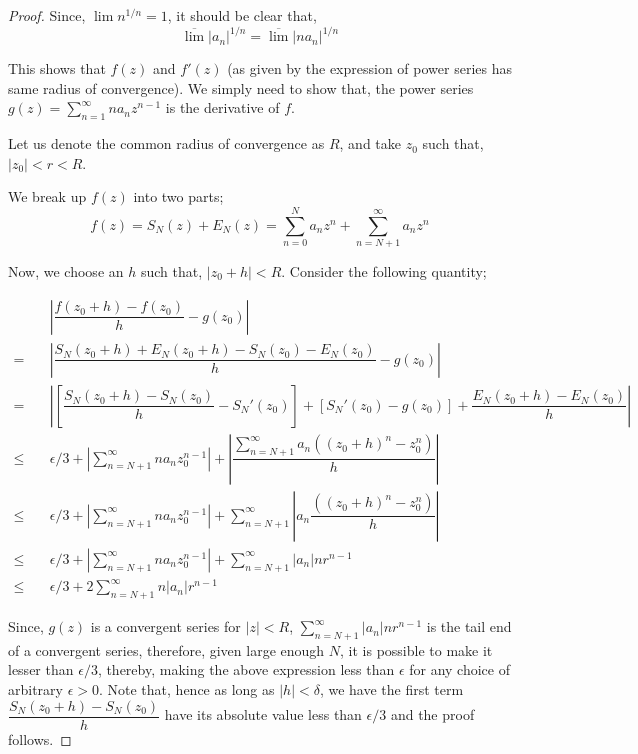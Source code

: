 \documentclass[12pt]{article}
\theoremstyle{definition}
\begin{document}
\begin{proof}
    Since, $\lim n^{1/n} = 1$, it should be clear that,
    $$\overline{\lim} \vert a_n\vert^{1/n} = \overline{\lim} \vert n a_n \vert^{1/n}$$

    This shows that $f(z)$ and $f'(z)$ (as given by the expression of power series has same radius of convergence). We simply need to show that, the power series $g(z) = \sum_{n=1}^{\infty} na_n z^{n-1}$ is the derivative of $f$.

    Let us denote the common radius of convergence as $R$, and take $z_0$ such that, $\vert z_0 \vert < r < R$.

    We break up $f(z)$ into two parts;
    $$f(z) = S_N(z) + E_N(z) = \sum_{n=0}^{N} a_n z^n + \sum_{n = N+1}^{\infty} a_n z^n$$

    Now, we choose an $h$ such that, $\vert z_0 + h \vert < R$. Consider the following quantity;

    \begin{align*}
        & \quad \left\vert \dfrac{f(z_0 + h) - f(z_0)}{h} - g(z_0) \right\vert \\
        = & \quad \left\vert \dfrac{S_N(z_0 + h) + E_N(z_0 + h) - S_N(z_0) - E_N(z_0)}{h} - g(z_0) \right\vert \\
        = & \quad \left\vert \left[\dfrac{S_N(z_0 + h) - S_N(z_0)}{h} - S_N'(z_0) \right] + \left[ S_N'(z_0) - g(z_0) \right] + \dfrac{E_N(z_0 + h) - E_N(z_0)}{h} \right\vert \\
        \leq & \quad \epsilon/3 + \left\vert \sum_{n= N + 1}^{\infty} na_n z_0^{n-1} \right\vert + \left\vert \dfrac{\sum_{n = N+1}^{\infty} a_n \left( (z_0 + h)^n - z_0^n \right)}{h} \right\vert\\
        \leq & \quad \epsilon/3 +\left\vert \sum_{n= N + 1}^{\infty} na_n z_0^{n-1} \right\vert + \sum_{n = N+1}^{\infty} \left\vert a_n \dfrac{\left( (z_0 + h)^n - z_0^n \right)}{h} \right\vert \\
        \leq & \quad \epsilon/3 + \left\vert \sum_{n= N + 1}^{\infty} na_n z_0^{n-1} \right\vert + \sum_{n = N+1}^{\infty} \vert a_n \vert n r^{n-1}\\
        \leq & \quad \epsilon/3 + 2 \sum_{n= N + 1}^{\infty} n\vert a_n\vert r^{n-1} 
    \end{align*}

    Since, $g(z)$ is a convergent series for $\vert z\vert < R$, $\sum_{n = N+1}^{\infty} \vert a_n \vert n r^{n-1}$ is the tail end of a convergent series, therefore, given large enough $N$, it is possible to make it lesser than $\epsilon / 3$, thereby, making the above expression less than $\epsilon$ for any choice of arbitrary $\epsilon > 0$. Note that, hence as long as $\vert h \vert < \delta$, we have the first term $\dfrac{S_N(z_0 + h) - S_N(z_0)}{h}$ have its absolute value less than $\epsilon/ 3$ and the proof follows.
\end{proof}
\end{document}
